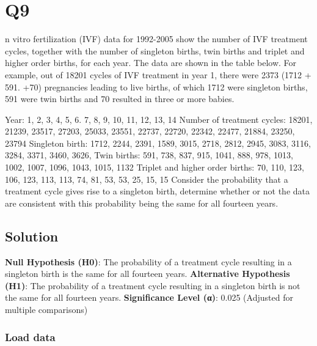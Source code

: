\documentclass[
]{article}
\begin{document}
\hypertarget{q9}{%
\section{Q9}\label{q9}}

n vitro fertilization (IVF) data for 1992-2005 show the number of IVF
treatment cycles, together with the number of singleton births, twin
births and triplet and higher order births, for each year. The data are
shown in the table below. For example, out of 18201 cycles of IVF
treatment in year 1, there were 2373 (1712 + 591. +70) pregnancies
leading to live births, of which 1712 were singleton births, 591 were
twin births and 70 resulted in three or more babies.

Year: 1, 2, 3, 4, 5, 6. 7, 8, 9, 10, 11, 12, 13, 14 Number of treatment
cycles: 18201, 21239, 23517, 27203, 25033, 23551, 22737, 22720, 22342,
22477, 21884, 23250, 23794 Singleton birth: 1712, 2244, 2391, 1589,
3015, 2718, 2812, 2945, 3083, 3116, 3284, 3371, 3460, 3626, Twin births:
591, 738, 837, 915, 1041, 888, 978, 1013, 1002, 1007, 1096, 1043, 1015,
1132 Triplet and higher order births: 70, 110, 123, 106, 123, 113, 113,
74, 81, 53, 53, 25, 15, 15 Consider the probability that a treatment
cycle gives rise to a singleton birth, determine whether or not the data
are consistent with this probability being the same for all fourteen
years.

\hypertarget{solution-9}{%
\subsection{Solution}\label{solution-9}}

\textbf{Null Hypothesis (H0)}: The probability of a treatment cycle
resulting in a singleton birth is the same for all fourteen years.
\textbf{Alternative Hypothesis (H1)}: The probability of a treatment
cycle resulting in a singleton birth is not the same for all fourteen
years. \textbf{Significance Level (α)}: 0.025 (Adjusted for multiple
comparisons)

\hypertarget{load-data-9}{%
\subsubsection{Load data}\label{load-data-9}}
\end{document}
